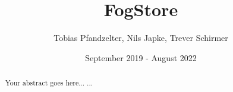 \documentclass[12pt,a4paper,oneside]{report}
\title{FogStore}
\author{
    Tobias Pfandzelter,
Nils Japke,
Trever Schirmer}
\date{September 2019 - August 2022}
\begin{document}
\maketitle

\begin{abstract}
    Your abstract goes here...
    ...
\end{abstract}

\tableofcontents
\listoffigures
\listoftables







\appendix
%

\end{document}

